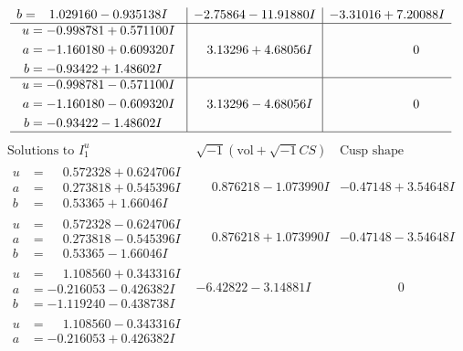 \documentclass[1p]{elsarticle_modified}
\theoremstyle{definition}
\newcommand{\I}{\sqrt{-1}}
\begin{document}
$$\begin{array}{c|c|c}
\begin{aligned}
b &= \phantom{-}1.029160 - 0.935138 I\end{aligned}
 & -2.75864 - 11.91880 I & -3.31016 + 7.20088 I \\ \hline\begin{aligned}
u &= -0.998781 + 0.571100 I \\
a &= -1.160180 + 0.609320 I \\
b &= -0.93422 + 1.48602 I\end{aligned}
 & \phantom{-}3.13296 + 4.68056 I & \phantom{-0.000000 } 0 \\ \hline\begin{aligned}
u &= -0.998781 - 0.571100 I \\
a &= -1.160180 - 0.609320 I \\
b &= -0.93422 - 1.48602 I\end{aligned}
 & \phantom{-}3.13296 - 4.68056 I & \phantom{-0.000000 } 0\\
 \hline 
 \end{array}$$\newpage$$\begin{array}{c|c|c}  
\text{Solutions to }I^u_{1}& \I (\text{vol} + \sqrt{-1}CS) & \text{Cusp shape}\\
 \hline 
\begin{aligned}
u &= \phantom{-}0.572328 + 0.624706 I \\
a &= \phantom{-}0.273818 + 0.545396 I \\
b &= \phantom{-}0.53365 + 1.66046 I\end{aligned}
 & \phantom{-}0.876218 - 1.073990 I & -0.47148 + 3.54648 I \\ \hline\begin{aligned}
u &= \phantom{-}0.572328 - 0.624706 I \\
a &= \phantom{-}0.273818 - 0.545396 I \\
b &= \phantom{-}0.53365 - 1.66046 I\end{aligned}
 & \phantom{-}0.876218 + 1.073990 I & -0.47148 - 3.54648 I \\ \hline\begin{aligned}
u &= \phantom{-}1.108560 + 0.343316 I \\
a &= -0.216053 - 0.426382 I \\
b &= -1.119240 - 0.438738 I\end{aligned}
 & -6.42822 - 3.14881 I & \phantom{-0.000000 } 0 \\ \hline\begin{aligned}
u &= \phantom{-}1.108560 - 0.343316 I \\
a &= -0.216053 + 0.426382 I \\

\end{aligned}
\end{array}$$
\end{document}
